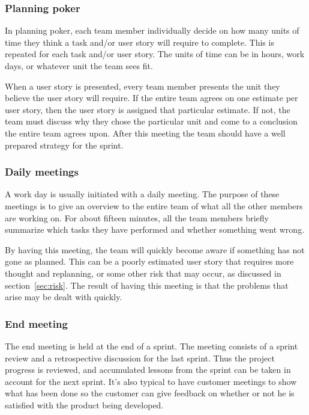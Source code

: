 \subsubsection{Planning poker}
In planning poker, each team member individually decide on how many units of time they think a task and/or user story will require to complete. This is repeated for each task and/or user story. The units of time can be in hours, work days, or whatever unit the team sees fit.

When a user story is presented, every team member presents the unit they believe the user story will require. If the entire team agrees on one estimate per user story, then the user story is assigned that particular estimate. If not, the team must discuss why they chose the particular unit and come to a conclusion the entire team agrees upon.
After this meeting the team should have a well prepared strategy for the sprint.

\subsubsection{Daily meetings}
A work day is usually initiated with a daily meeting. The purpose of these meetings is to give an overview to the entire team of what all the other members are working on. For about fifteen minutes, all the team members briefly summarize which tasks they have performed and whether something went wrong.

By having this meeting, the team will quickly become aware if something has not gone as planned. This can be a poorly estimated user story that requires more thought and replanning, or some other risk that may occur, as discussed in section~\ref{sec:risk}. The result of having this meeting is that the problems that arise may be dealt with quickly.

\subsubsection{End meeting}
The end meeting is held at the end of a sprint. The meeting consists of a sprint review and a retrospective discussion for the last sprint.
Thus the project progress is reviewed, and accumulated lessons from the sprint can be taken in account for the next sprint.
It's also typical to have customer meetings to show what has been done so the customer can give feedback on whether or not he is satisfied with the product being developed.

